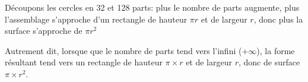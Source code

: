 \documentclass[12pt]{article}
\begin{document}
\begin{center}
\end{center}

Découpons les cercles en 32 et 128 parts: plus le nombre de parts augmente, plus l'assemblage s'approche d'un rectangle de hauteur $\pi r$ et de largeur $r$, donc plus la surface s'approche de $\pi r^2$

\begin{center}
\end{center}

Autrement dit, lorsque que le nombre de parts tend vers l'infini ($+\infty$), la forme résultant tend vers un rectangle de hauteur $\pi \times r$ et de largeur $r$, donc de surface $\pi \times r^2$.
\end{document}

